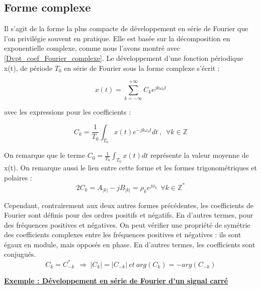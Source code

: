	\subsection{Forme complexe}
	
	Il s'agit de la forme la plus compacte de développement en série de Fourier que l'on privilégie souvent en pratique. Elle est basée sur la décomposition en exponentielle complexe, comme nous l'avons montré avec \ref{Dvpt_coef_Fourier_complexe}. Le développement d'une fonction périodique x(t), de période $T_{0}$ en série de Fourier sous la forme complexe s'écrit :
	
	\begin{equation}\label{Serie_Fourier_Complexe}
	x(t)=\sum_{k=-\infty}^{+\infty}C_{k}e^{jk\omega_{0}t}
	\end{equation}
	
	avec les expressions pour les coefficients :
	
	\begin{equation}\label{Coef_Serie_Fourier_Complexe}
	C_{k}=\frac{1}{T_{0}}\int_{T_{0}}x(t)e^{-jk\omega_{0}t}dt~,~~\forall k \in \mathbb{Z}
	\end{equation}
	
	On remarque que le terme $C_{0}=\frac{1}{T_{0}}\int_{T_{0}}x(t)dt$ représente la valeur moyenne de x(t). On remarque aussi le lien entre cette forme et les formes trigonométriques et polaires :
	\begin{equation}\label{Lien_formes_coef_Fourier}
	2C_{k}=A_{|k|}-jB_{|k|}=\rho_{k}e^{j\phi_{k}}~~\forall k \in \mathbb{Z^{*}}
	\end{equation}
	
	Cependant, contrairement aux deux autres formes précédentes, les coefficients de Fourier sont définis pour des ordres positifs et négatifs. En d'autres termes, pour des fréquences positives et négatives. On peut vérifier une propriété de symétrie des coefficients complexes entre les fréquences positives et négatives : ils sont égaux en module, mais opposés en phase. En d'autres termes, les coefficients sont conjugués.\\
	\begin{equation}\label{key}
	C_k=C_{-k}^{*}~~\Rightarrow~|C_k|=|C_{-k}|~et~arg(C_k)=-arg(C_{-k})
	\end{equation}
	
	\underline{\textbf{Exemple : Développement en série de Fourier d'un signal carré\\}}
	
